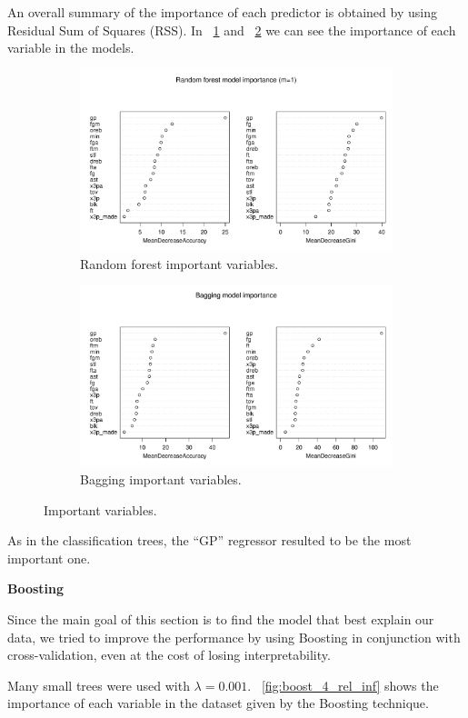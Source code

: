 An overall summary of the importance of each predictor is obtained by using Residual Sum of Squares (RSS). In \Fig~\ref{fig:best_for_500_var_imp_plot} and \Fig~\ref{fig:bagg_500_var_imp_plot} we can see the importance of each variable in the models.

\begin{figure}[H]
	\centering
	\begin{subfigure}{.5\textwidth}
		\centering
		\includegraphics[width=0.5\linewidth]{ImageFiles/Classification/Trees/best_for_500_var_imp_plot.pdf}
		\caption{Random forest important variables.}
		\label{fig:best_for_500_var_imp_plot}
	\end{subfigure}%
	\hfill
	\begin{subfigure}{.5\textwidth}
		\centering
		\includegraphics[width=0.5\linewidth]{ImageFiles/Classification/Trees/bagg_500_var_imp_plot.pdf}
		\caption{Bagging important variables.}
		\label{fig:bagg_500_var_imp_plot}
	\end{subfigure}
	\caption{Important variables.}
	\label{fig:ImpVar}
\end{figure}

\noindent
As in the classification trees, the ``GP'' regressor resulted to be the most important one.

\vspace{0.2cm}
\noindent
\textbf{Boosting}

Since the main goal of this section is to find the model that best explain our data, we tried to improve the performance by using Boosting in conjunction with cross-validation, even at the cost of losing interpretability. 

Many small trees were used with $\lambda = 0.001$. \Fig~\ref{fig:boost_4_rel_inf} shows the importance of each variable in the dataset given by the Boosting technique.

